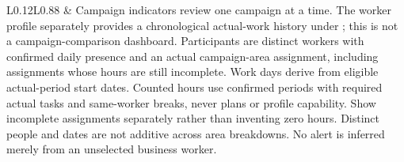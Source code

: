 {\begin{longtable}{L{0.12}L{0.88}}
\midrule
{}\label{br:037}\textbf{} & Campaign indicators review one campaign at a time. The worker profile separately provides a chronological actual-work history under ; this is not a campaign-comparison dashboard. Participants are distinct workers with confirmed daily presence and an actual campaign-area assignment, including assignments whose hours are still incomplete. Work days derive from eligible actual-period start dates. Counted hours use confirmed periods with required actual tasks and same-worker breaks, never plans or profile capability. Show incomplete assignments separately rather than inventing zero hours. Distinct people and dates are not additive across area breakdowns. No alert is inferred merely from an unselected business worker. \\


\end{longtable}}
